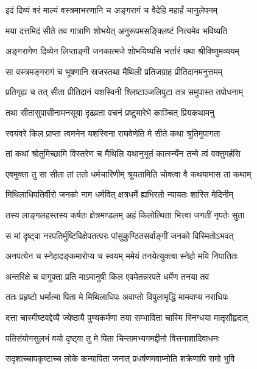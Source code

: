 \twolineshloka
{इदं दिव्यं वरं माल्यं वस्त्रमाभरणानि च}
{अङ्गरागं च वैदेहि महार्हं चानुलेपनम्} %

\twolineshloka
{मया दत्तमिदं सीते तव गात्राणि शोभयेत्}
{अनुरूपमसङ्क्लिष्टं नित्यमेव भविष्यति} %

\twolineshloka
{अङ्गरागेण दिव्येन लिप्ताङ्गी जनकात्मजे}
{शोभयिष्यसि भर्त्तारं यथा श्रीविष्णुमव्ययम्} %

\twolineshloka
{सा वस्त्रमङ्गरागं च भूषणानि स्रजस्तथा}
{मैथिली प्रतिजग्राह प्रीतिदानमनुत्तमम्} %

\twolineshloka
{प्रतिगृह्य च तत् सीता प्रीतिदानं यशस्विनी}
{श्लिष्टाञ्जलिपुटा तत्र समुपास्त तपोधनाम्} %

\twolineshloka
{तथा सीतासुपासीनामनसूया दृढव्रता}
{वचनं प्रष्टुमारेभे काञ्चित् प्रियकथामनु} %

\twolineshloka
{स्वयंवरे किल प्राप्ता त्वमनेन यशस्विना}
{राघवेणेति मे सीते कथा श्रुतिमुपागता} %

\twolineshloka
{तां कथां श्रोतुमिच्छामि विस्तरेण च मैथिलि}
{यथानुभूतं कार्त्स्न्येन तन्मे त्वं वक्तुमर्हसि} %

\twolineshloka
{एवमुक्ता तु सा सीता तां ततो धर्मचारिणीम्}
{श्रूयतामिति चोक्त्वा वै कथयामास तां कथाम्} %

\twolineshloka
{मिथिलाधिपतिर्वीरो जनको नाम धर्मवित्}
{क्षत्रधर्मे ह्यभिरतो न्यायतः शास्ति मेदिनीम्} %

\twolineshloka
{तस्य लाङ्गलहस्तस्य कर्षतः क्षेत्रमण्डलम्}
{अहं किलोत्थिता भित्त्वा जगतीं नृपतेः सुता} %

\twolineshloka
{स मां दृष्ट्वा नरपतिर्मुष्टिविक्षेपतत्परः}
{पांसुकुण्ठितसर्वाङ्गीं जनको विस्मितोऽभवत्} %

\twolineshloka
{अनपत्येन च स्नेहादङ्कमारोप्य च स्वयम्}
{ममेयं तनयेत्युक्त्वा स्नेहो मयि निपातितः} %

\twolineshloka
{अन्तरिक्षे च वागुक्ता प्रति माऽमानुषी किल}
{एवमेतन्नरपते धर्मेण तनया तव} %

\twolineshloka
{ततः प्रहृष्टो धर्मात्मा पिता मे मिथिलाधिपः}
{अवाप्तो विपुलामृद्धिं मामवाप्य नराधिपः} %

\twolineshloka
{दत्ता चास्मीष्टवद्देव्यै ज्येष्ठायै पुण्यकर्मणा}
{तया सम्भाविता चास्मि स्निग्धया मातृसौहृदात्} %

\twolineshloka
{पतिसंयोगसुलभं वयो दृष्ट्वा तु मे पिता}
{चिन्तामभ्यगमद्दीनो वित्तनाशादिवाधनः} %

\twolineshloka
{सदृशाच्चापकृष्टाच्च लोके कन्यापिता जनात्}
{प्रधर्षणमवाप्नोति शक्रेणापि समो भुवि} %

